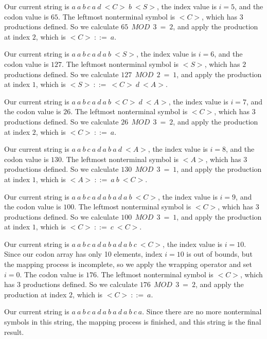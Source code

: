Our current string is $a\:a\:b\:c\:a\:d\:{<}C{>}\:b\:{<}S{>}$, the index value is $i = 5$, and the codon value is $65$. The leftmost nonterminal symbol is ${<}C{>}$, which has $3$ productions defined. So we calculate $65\:\:MOD\:\:3\:=\:2$, and apply the production at index $2$, which is ${<}C{>}\:::=\:a$.

Our current string is $a\:a\:b\:c\:a\:d\:a\:b\:{<}S{>}$, the index value is $i = 6$, and the codon value is $127$. The leftmost nonterminal symbol is ${<}S{>}$, which has $2$ productions defined. So we calculate $127\:\:MOD\:\:2\:=\:1$, and apply the production at index $1$, which is ${<}S{>}\:::=\:{<}C{>}\:d\:{<}A{>}$.

Our current string is $a\:a\:b\:c\:a\:d\:a\:b\:{<}C{>}\:d\:{<}A{>}$, the index value is $i = 7$, and the codon value is $26$. The leftmost nonterminal symbol is ${<}C{>}$, which has $3$ productions defined. So we calculate $26\:\:MOD\:\:3\:=\:2$, and apply the production at index $2$, which is ${<}C{>}\:::=\:a$.

Our current string is $a\:a\:b\:c\:a\:d\:a\:b\:a\:d\:{<}A{>}$, the index value is $i = 8$, and the codon value is $130$. The leftmost nonterminal symbol is ${<}A{>}$, which has $3$ productions defined. So we calculate $130\:\:MOD\:\:3\:=\:1$, and apply the production at index $1$, which is ${<}A{>}\:::=\:a\:b\:{<}C{>}$.

Our current string is $a\:a\:b\:c\:a\:d\:a\:b\:a\:d\:a\:b\:{<}C{>}$, the index value is $i = 9$, and the codon value is $100$. The leftmost nonterminal symbol is ${<}C{>}$, which has $3$ productions defined. So we calculate $100\:\:MOD\:\:3\:=\:1$, and apply the production at index $1$, which is ${<}C{>}\:::=\:c\:{<}C{>}$.

Our current string is $a\:a\:b\:c\:a\:d\:a\:b\:a\:d\:a\:b\:c\:{<}C{>}$, the index value is $i = 10$. Since our codon array has only 10 elements, index $i = 10$ is out of bounds, but the mapping process is incomplete, so we apply the wrapping operator and set $i = 0$. The codon value is $176$. The leftmost nonterminal symbol is ${<}C{>}$, which has $3$ productions defined. So we calculate $176\:\:MOD\:\:3\:=\:2$, and apply the production at index $2$, which is ${<}C{>}\:::=\:a$.

Our current string is $a\:a\:b\:c\:a\:d\:a\:b\:a\:d\:a\:b\:c\:a$. Since there are no more nonterminal symbols in this string, the mapping process is finished, and this string is the final result.